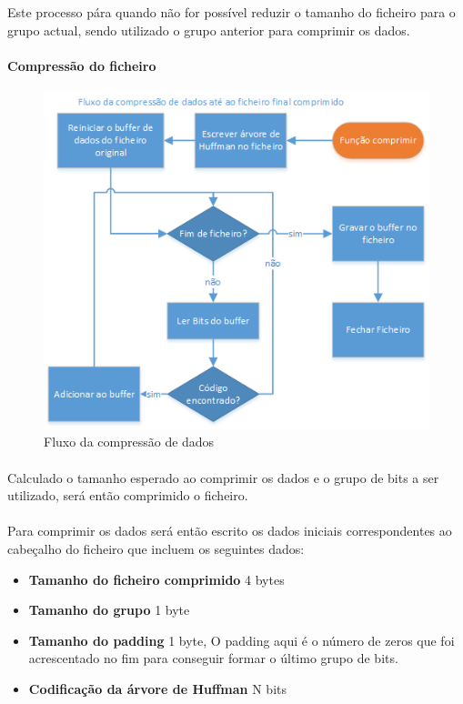 \documentclass[paper=a4, fontsize=11pt]{scrartcl}
\numberwithin{equation}{section}		%
\numberwithin{figure}{section}			%
\numberwithin{table}{section}				%
\begin{document}
Este processo pára quando não for possível reduzir o tamanho do ficheiro para o grupo actual, sendo utilizado o grupo anterior para comprimir os dados.
\pagebreak
\paragraph{Compressão do ficheiro}
\begin{figure}[h!]
\centering
\includegraphics[scale=1]{fluxocompressao.png} %
\caption{\label{fig:fluxocompressao}Fluxo da compressão de dados}
\end{figure}
\FloatBarrier
\paragraph{}Calculado o tamanho esperado ao comprimir os dados e o grupo de bits a ser utilizado, será então comprimido o ficheiro.
\\
\paragraph{}Para comprimir os dados será então escrito os dados iniciais correspondentes ao cabeçalho do ficheiro que incluem os seguintes dados:
\begin{itemize}
\item \textbf{Tamanho do ficheiro comprimido} 4 bytes
\item \textbf{Tamanho do grupo} 1 byte
\item \textbf{Tamanho do padding} 1 byte, O padding aqui é o número de zeros que foi acrescentado no fim para conseguir formar o último grupo de bits.
\item \textbf{Codificação da árvore de Huffman} N bits
\end{itemize}
\end{document}
